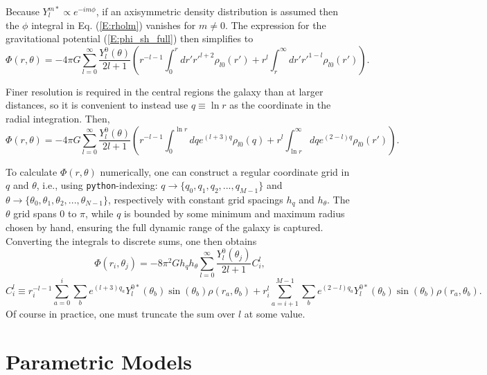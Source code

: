 \documentclass[11pt,a4paper]{article}
\begin{document}
Because $Y_l^{m*} \propto e^{-i m \phi}$, if an axisymmetric density distribution is assumed then the $\phi$ integral in Eq. (\ref{E:rholm}) vanishes for $m \neq 0$. The expression for the gravitational potential (\ref{E:phi_sh_full}) then simplifies to
\begin{equation}
    \Phi(r, \theta) = - 4\pi G \sum_{l=0}^\infty \frac{Y_l^0(\theta)}{2l+1}\left(r^{-l-1}\int_0^r dr' r'^{l+2} \rho_{l0}(r')+ r^l\int_r^\infty dr' r'^{1-l} \rho_{l0}(r') \right).
\end{equation}

Finer resolution is required in the central regions the galaxy than at larger distances, so it is convenient to instead use $q \equiv \ln r$ as the coordinate in the radial integration. Then,
\begin{equation}
    \Phi(r, \theta) = - 4\pi G \sum_{l=0}^\infty \frac{Y_l^0(\theta)}{2l+1}\left(r^{-l-1}\int_0^{\ln r} dq e^{(l+3)q} \rho_{l0}(q)+ r^l\int_{\ln r}^\infty dq e^{(2-l)q} \rho_{l0}(r') \right).
\end{equation}

To calculate $\Phi(r, \theta)$ numerically, one can construct a regular coordinate grid in $q$ and $\theta$, i.e., using \texttt{python}-indexing: $q \rightarrow \{q_0, q_1, q_2, ..., q_{M-1}\}$ and $\theta \rightarrow \{\theta_0, \theta_1, \theta_2, ..., \theta_{N-1}\}$, respectively with constant grid spacings $h_q$ and $h_\theta$. The $\theta$ grid spans $0$ to $\pi$, while $q$ is bounded by some minimum and maximum radius chosen by hand, ensuring the full dynamic range of the galaxy is captured. Converting the integrals to discrete sums, one then obtains
\begin{equation}
    \Phi(r_i, \theta_j) = - 8\pi^2 G h_q h_\theta \sum_{l=0}^\infty \frac{Y_l^0(\theta_j)}{2l+1} C_i^l,
\end{equation}
\begin{equation}
    C_i^l \equiv r_i^{-l-1}\sum_{a=0}^{i}\sum_b e^{(l+3)q_a} Y_l^{0*}(\theta_b) \sin(\theta_b) \rho(r_a, \theta_b) + r_i^l\sum_{a=i+1}^{M-1}\sum_b e^{(2-l)q_a} Y_l^{0*}(\theta_b) \sin(\theta_b) \rho(r_a, \theta_b).
\end{equation}
Of course in practice, one must truncate the sum over $l$ at some value.







\section{Parametric Models}
\end{document}
